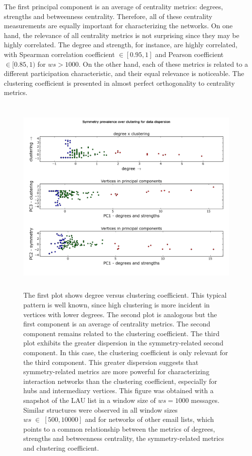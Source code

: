 \documentclass[%
	aip,
	jmp,%
	amsmath,amssymb,
	reprint,%
]{revtex4-1}
\begin{document}
The first principal component is an average of centrality metrics: degrees, strengths and betweenness centrality. Therefore, all of these centrality measurements are equally important for characterizing the networks. On one hand, the relevance of all centrality metrics is not surprising since they may be highly correlated. The degree and strength, for instance, are highly correlated, with Spearman correlation coefficient $\in [0.95,1]$ and Pearson coefficient $\in [0.85,1)$ for $ws>1000$. On the other hand, each of these metrics is related to a different participation characteristic, and their equal relevance is noticeable.
The clustering coefficient is presented in almost perfect orthogonality to centrality metrics.
\begin{figure} 
	\centering
	\includegraphics[width=.6\textwidth,height=10cm]{figs/im13PCAPLOT_}
	\caption{The first plot shows degree versus clustering coefficient. This typical pattern is well known, since high clustering is more incident in vertices with lower degrees. The second plot is analogous but the first component is an average of centrality metrics. The second component remains related to the clustering coefficient. The third plot exhibits the greater dispersion in the symmetry-related second component. In this case, the clustering coefficient is only relevant for the third component. This greater dispersion suggests that symmetry-related metrics are more powerful for characterizing interaction networks than the clustering coefficient, especially for hubs and intermediary vertices.
	This figure was obtained with a snapshot of the LAU list in a window size of $ws = 1000$ messages. Similar structures were observed in all window sizes $ws\;\in\;[500,10000]$ and for networks of other email lists, which points to a common relationship between the metrics of degrees, strengths and betweenness centrality, the symmetry-related metrics and clustering coefficient.}
	\label{fig:sym}
\end{figure}
\end{document}
